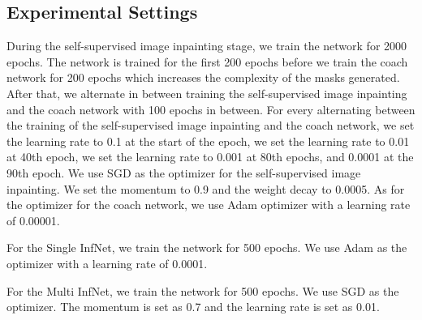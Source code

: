 \subsection{Experimental Settings}
During the self-supervised image inpainting stage, we train the network for 2000 epochs. The network is trained for the first 200 epochs before we train the coach network for 200 epochs which increases the complexity of the masks generated. After that, we alternate in between training the self-supervised image inpainting and the coach network with 100 epochs in between. For every alternating between the training of the self-supervised image inpainting and the coach network, we set the learning rate to 0.1 at the start of the epoch, we set the learning rate to 0.01 at 40th epoch, we set the learning rate to 0.001 at 80th epochs, and 0.0001 at the 90th epoch.  We use SGD as the optimizer for the self-supervised image inpainting.  We set the momentum to 0.9 and the weight decay to 0.0005. As for the optimizer for the coach network, we use Adam optimizer with a learning rate of 0.00001.

For the Single InfNet, we train the network for 500 epochs. We use Adam as the optimizer with a learning rate of 0.0001. 

For the Multi InfNet, we train the network for 500 epochs. We use SGD as the optimizer. The momentum is set as 0.7 and the learning rate is set as 0.01.

